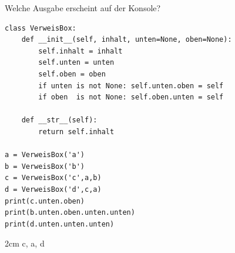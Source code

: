 \question[3]
Welche Ausgabe erscheint auf der Konsole?
\begin{lstlisting}
class VerweisBox:
    def __init__(self, inhalt, unten=None, oben=None):
        self.inhalt = inhalt
        self.unten = unten
        self.oben = oben
        if unten is not None: self.unten.oben = self
        if oben  is not None: self.oben.unten = self

    def __str__(self):
        return self.inhalt

a = VerweisBox('a')
b = VerweisBox('b')
c = VerweisBox('c',a,b)
d = VerweisBox('d',c,a)
print(c.unten.oben)
print(b.unten.oben.unten.unten)
print(d.unten.unten.unten)
\end{lstlisting}

\begin{solutionbox}{2cm}
c, a, d
\end{solutionbox}
